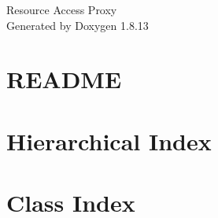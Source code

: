 \documentclass[twoside]{book}
\newcommand{\+}{\discretionary{\mbox{\scriptsize$\hookleftarrow$}}{}{}}
\newcommand{\clearemptydoublepage}{%
  \newpage{\pagestyle{empty}\cleardoublepage}%
}
\begin{document}
\hypersetup{pageanchor=false,
             bookmarksnumbered=true,
             pdfencoding=unicode
            }
\begin{titlepage}
\vspace*{7cm}
\begin{center}%
{\Large Resource Access Proxy }\\
\vspace*{1cm}
{\large Generated by Doxygen 1.8.13}\\
\end{center}
\end{titlepage}
\clearemptydoublepage
{}
\tableofcontents
\clearemptydoublepage
{}
\hypersetup{pageanchor=true}

\chapter{R\+E\+A\+D\+ME}
\label{md_README}

\chapter{Hierarchical Index}

\chapter{Class Index}

\end{document}
